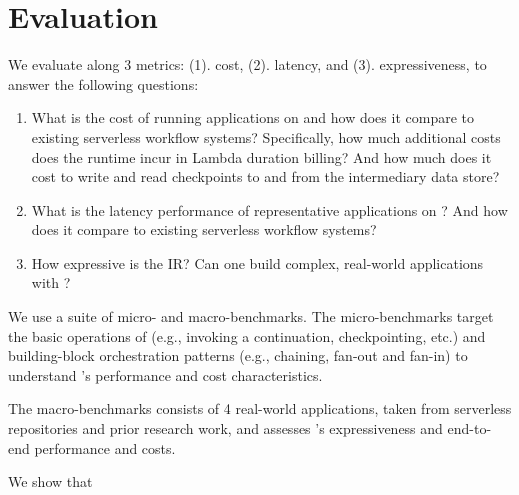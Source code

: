 
\section{Evaluation}\label{sec:eval}

We evaluate \name{} along 3 metrics: (1). cost, (2). latency, and (3).
expressiveness, to answer the following questions:

\begin{enumerate}

    \item What is the cost of running applications on \name{} and how does it
    compare to existing serverless workflow systems? Specifically, how much
    additional costs does the \name{} runtime incur in Lambda duration
    billing? And how much does it cost to write and read checkpoints to and
    from the intermediary data store?

    \item What is the latency performance of representative applications on
    \name{}? And how does it compare to existing serverless workflow systems?

    \item How expressive is the \name{} IR? Can one build complex, real-world
    applications with \name{}? 

\end{enumerate}


We use a suite of micro- and macro-benchmarks. The micro-benchmarks target the
basic operations of \name{} (e.g., invoking a continuation, checkpointing,
etc.) and building-block orchestration patterns (e.g., chaining, fan-out and
fan-in) to understand \name{}'s performance and cost characteristics.

The macro-benchmarks consists of 4 real-world applications, taken from
serverless repositories and prior research work, and assesses \name{}'s
expressiveness and end-to-end performance and costs.

We show that 

